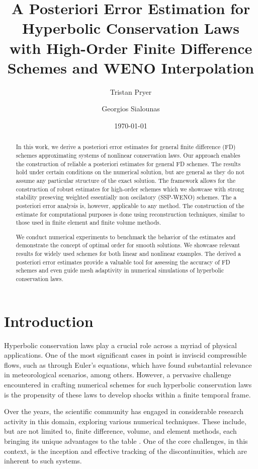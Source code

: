 \documentclass[final]{amsart}
\author{
  Tristan Pryer
}
\author{
  Georgios Sialounas
}
\title{ A Posteriori Error Estimation for Hyperbolic Conservation Laws
  with High-Order Finite Difference Schemes and WENO Interpolation
}
\date{\today}
\numberwithin{equation}{section}
\begin{document}
\maketitle
\begin{abstract}
  In this work, we derive a posteriori error estimates for general
  finite difference (FD) schemes approximating systems of nonlinear
  conservation laws. Our approach enables the construction of reliable
  a posteriori estimates for general FD schemes. The results hold under certain conditions on the numerical
  solution, but are general as they do not assume any particular
  structure of the exact solution. The framework allows for the
  construction of robust estimates for high-order schemes which we
  showcase with strong stability preseving weighted essentially non
  oscilatory (SSP-WENO) schemes. The a posteriori error analysis is,
  however, applicable to any method. The construction of the estimate
  for computational purposes is done using reconstruction techniques,
  similar to those used in finite element and finite volume methods.

  We conduct numerical experiments to benchmark the behavior of the
  estimates and demonstrate the concept of optimal order for smooth
  solutions. We showcase relevant results for widely used schemes for
  both linear and nonlinear examples. The derived a posteriori error
  estimates provide a valuable tool for assessing the accuracy of FD
  schemes and even guide mesh adaptivity in numerical simulations of
  hyperbolic conservation laws.
\end{abstract}

\section{Introduction}
\label{sec:introduction}

Hyperbolic conservation laws play a crucial role across a myriad of
physical applications. One of the most significant cases in point is
inviscid compressible flows, such as through Euler's equations, which
have found substantial relevance in meteorological scenarios, among
others. However, a pervasive challenge encountered in crafting
numerical schemes for such hyperbolic conservation laws is the
propensity of these laws to develop shocks within a finite temporal
frame.

Over the years, the scientific community has engaged in considerable
research activity in this domain, exploring various numerical
techniques. These include, but are not limited to, finite difference,
volume, and element methods, each bringing its unique advantages to
the table
\cite{cockburn1995convergence,kroner1994convergence,leveque2002finite}. One
of the core challenges, in this context, is the inception and
effective tracking of the discontinuities, which are inherent to such
systems.
\end{document}
